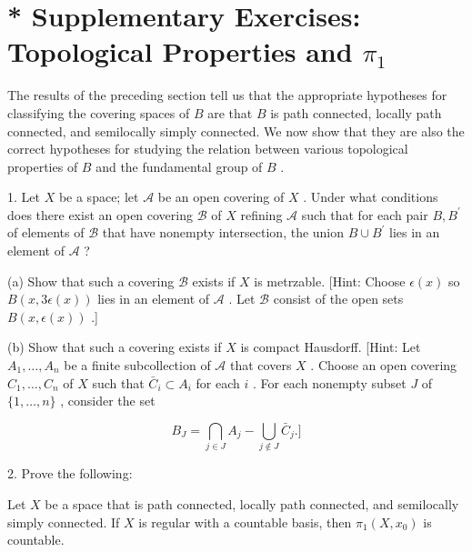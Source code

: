 \section*{* Supplementary Exercises: Topological Properties and \({\pi }_{1}\)}

The results of the preceding section tell us that the appropriate hypotheses for classifying the covering spaces of \(B\) are that \(B\) is path connected, locally path connected, and semilocally simply connected. We now show that they are also the correct hypotheses for studying the relation between various topological properties of \(B\) and the fundamental group of \(B\) .

1. Let \(X\) be a space; let \(\mathcal{A}\) be an open covering of \(X\) . Under what conditions does there exist an open covering \(\mathcal{B}\) of \(X\) refining \(\mathcal{A}\) such that for each pair \(B,{B}^{\prime }\) of elements of \(\mathcal{B}\) that have nonempty intersection, the union \(B \cup  {B}^{\prime }\) lies in an element of \(\mathcal{A}\) ?

(a) Show that such a covering \(\mathcal{B}\) exists if \(X\) is metrzable. [Hint: Choose \(\epsilon \left( x\right)\) so \(B\left( {x,{3\epsilon }\left( x\right) }\right)\) lies in an element of \(\mathcal{A}\) . Let \(\mathcal{B}\) consist of the open sets \(B\left( {x,\epsilon \left( x\right) }\right)\) .]

(b) Show that such a covering exists if \(X\) is compact Hausdorff. [Hint: Let \({A}_{1},\ldots ,{A}_{n}\) be a finite subcollection of \(\mathcal{A}\) that covers \(X\) . Choose an open covering \({C}_{1},\ldots ,{C}_{n}\) of \(X\) such that \({\bar{C}}_{i} \subset  {A}_{i}\) for each \(i\) . For each nonempty subset \(J\) of \(\{ 1,\ldots ,n\}\) , consider the set

\[
{B}_{J} = \mathop{\bigcap }\limits_{{j \in  J}}{A}_{j} - \mathop{\bigcup }\limits_{{j \notin  J}}{\bar{C}}_{j}.\rbrack
\]

2. Prove the following:

\begin{theorem} Let \(X\) be a space that is path connected, locally path connected, and semilocally simply connected. If \(X\) is regular with a countable basis, then \({\pi }_{1}\left( {X,{x}_{0}}\right)\) is countable.
\end{theorem}

